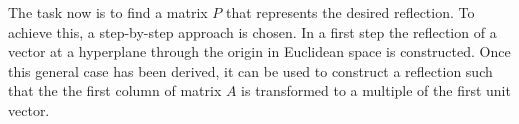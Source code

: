 The task now is to find a matrix $P$ that represents the desired reflection. To achieve this, a step-by-step approach is chosen. In a first step the reflection of a vector at a hyperplane through the origin in Euclidean space is constructed. Once this general case has been derived, it can be used to construct a reflection such that the the first column of matrix $A$ is transformed to a multiple of the first unit vector.



%		
%			
%		
%		
%		
%		
%		
%		

